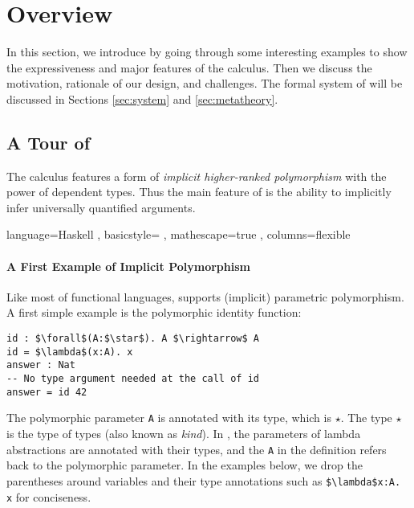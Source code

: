 \section{Overview}

In this section, we introduce \name by going through
some interesting examples to show the expressiveness and major features of the calculus.
Then we discuss the motivation, rationale of our design, and challenges.
The formal system of \name will be
discussed in Sections \ref{sec:system} and \ref{sec:metatheory}.

\subsection{A Tour of \name}
\label{sec:examples}

The \name calculus features a form of \emph{implicit
  higher-ranked polymorphism} with the power of dependent types. Thus the main feature of \name
is the ability to implicitly infer universally quantified arguments.

\lstset
  { language=Haskell
  , basicstyle=\ttfamily
  , mathescape=true
  , columns=flexible}

\paragraph{A First Example of Implicit Polymorphism}
Like most of functional languages, \name supports (implicit) parametric polymorphism.
A first simple example is the polymorphic identity function:
\begin{lstlisting}
id : $\forall$(A:$\star$). A $\rightarrow$ A
id = $\lambda$(x:A). x
answer : Nat
-- No type argument needed at the call of id
answer = id 42
\end{lstlisting}
\noindent The polymorphic parameter \lstinline{A} is annotated with its type,
which is $\star$. The type $\star$ is the type of types (also known as
\emph{kind}). In \name, the parameters of lambda abstractions are annotated
with their types, and the \lstinline{A} in the definition refers back to the
polymorphic parameter. In the examples below, we drop the parentheses around
variables and their type annotations such as \lstinline{$\lambda$x:A. x} for conciseness.

